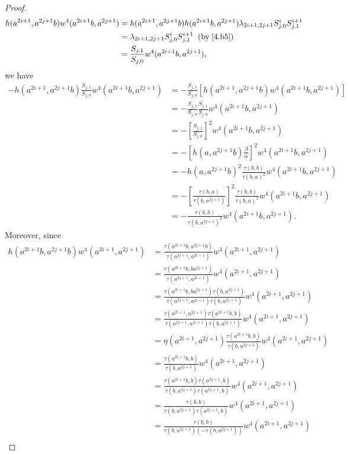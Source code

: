 \documentclass[a4paper,11pt]{amsart}
\numberwithin{equation}{section}
\begin{document}
\begin{proof}
\begin{align*}
h(a^{2i+1},a^{2j+1}b)w^4(a^{2i+1}b,a^{2j+1})&=h(a^{2i+1},a^{2j+1}b) h(a^{2i+1}b,a^{2j+1}) \lambda_{2i+1,2j+1} S_{j,0}^i S_{j,1}^{i+1}\\
&=\lambda_{2i+1,2j+1} S_{j,0}^i S_{j,1}^{i+1}\;\;(\text{by}\;\eqref{4.b5} )\\
&=\frac{S_{j,1}}{S_{j,0}} w^4(a^{2i+1}b,a^{2j+1}),
\end{align*}
we have
\begin{align*}
-h(a^{2i+1},a^{2j+1}b) \frac{S_{j,1}}{S_{j,0}} w^4(a^{2i+1}b,a^{2j+1})&=-\frac{S_{j,1}}{S_{j,0}} [h(a^{2i+1},a^{2j+1}b) w^4(a^{2i+1}b,a^{2j+1})]\\
&=-\frac{S_{j,1}}{S_{j,0}} \frac{S_{j,1}}{S_{j,0}} w^4(a^{2i+1}b,a^{2j+1})\\
&=-[\frac{S_{j,1}}{S_{j,0}}]^2 w^4(a^{2i+1}b,a^{2j+1})\\
&=-[h(a,a^{2j+1}b) \frac{\beta}{\alpha}]^2 w^4(a^{2i+1}b,a^{2j+1})\\
&=-h(a,a^{2j+1}b)^2 \frac{\tau(b,b)}{\tau(b,a)^2} w^4(a^{2i+1}b,a^{2j+1})\\
&=-[\frac{\tau(b,a)}{\tau(b,a^{2j+1})}]^2 \frac{\tau(b,b)}{\tau(b,a)^2} w^4(a^{2i+1}b,a^{2j+1})\\
&=-\frac{\tau(b,b)}{\tau(b,a^{2j+1})^2} w^4(a^{2i+1}b,a^{2j+1}).
\end{align*}
Moreover, since
\begin{align*}
h(a^{2i+1}b,a^{2j+1}b) w^4(a^{2i+1},a^{2j+1})&=\frac{\tau(a^{2i+1}b,a^{2j+1}b)}{\tau(a^{2j+1},a^{2i+1})} w^4(a^{2i+1},a^{2j+1})\\
&=\frac{\tau(a^{2i+1}b,ba^{2j+1})}{\tau(a^{2j+1},a^{2i+1})} w^4(a^{2i+1},a^{2j+1})\\
&=\frac{\tau(a^{2i+1}b,ba^{2j+1}) \tau(b,a^{2j+1})}{\tau(a^{2j+1},a^{2i+1}) \tau(b,a^{2j+1})} w^4(a^{2i+1},a^{2j+1})\\
&=\frac{\tau(a^{2i+1},a^{2j+1}) \tau(a^{2i+1}b,b)}{\tau(a^{2j+1},a^{2i+1}) \tau(b,a^{2j+1})} w^4(a^{2i+1},a^{2j+1})\\
&=\eta(a^{2i+1},a^{2j+1}) \frac{\tau(a^{2i+1}b,b)}{\tau(b,a^{2j+1})} w^4(a^{2i+1},a^{2j+1})\\
&=\frac{\tau(a^{2i+1}b,b)}{\tau(b,a^{2j+1})} w^4(a^{2i+1},a^{2j+1})\\
&=\frac{\tau(a^{2i+1}b,b) \tau(a^{2j+1},b)}{\tau(b,a^{2j+1}) \tau(a^{2j+1},b)} w^4(a^{2i+1},a^{2j+1})\\
&=\frac{\tau(b,b)}{\tau(b,a^{2j+1}) \tau(a^{2j+1},b)} w^4(a^{2i+1},a^{2j+1})\\
&=\frac{\tau(b,b)}{\tau(b,a^{2j+1}) (-\tau(b,a^{2j+1}))} w^4(a^{2i+1},a^{2j+1})\\

\end{align*}
\end{proof}
\end{document}
